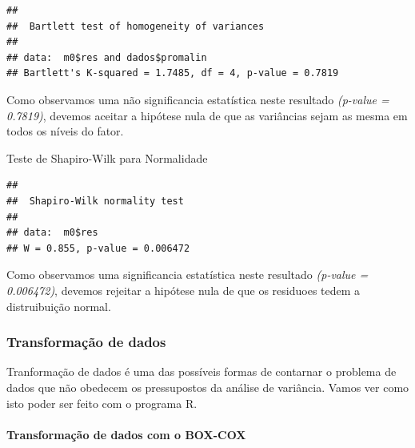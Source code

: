 \documentclass[
]{book}
\newenvironment{Shaded}{\begin{snugshade}}{\end{snugshade}}
\newcommand{\KeywordTok}[1]{\textcolor[rgb]{0.13,0.29,0.53}{\textbf{#1}}}
\newcommand{\NormalTok}[1]{#1}
\newcommand{\OperatorTok}[1]{\textcolor[rgb]{0.81,0.36,0.00}{\textbf{#1}}}
\begin{document}
\begin{Shaded}
\end{Shaded}

\begin{verbatim}
## 
##  Bartlett test of homogeneity of variances
## 
## data:  m0$res and dados$promalin
## Bartlett's K-squared = 1.7485, df = 4, p-value = 0.7819
\end{verbatim}

Como observamos uma não significancia estatística neste resultado \emph{(p-value = 0.7819)}, devemos aceitar a hipótese nula de que as variâncias sejam as mesma em todos os níveis do fator.

Teste de Shapiro-Wilk para Normalidade

\begin{Shaded}
\end{Shaded}

\begin{verbatim}
## 
##  Shapiro-Wilk normality test
## 
## data:  m0$res
## W = 0.855, p-value = 0.006472
\end{verbatim}

Como observamos uma significancia estatística neste resultado \emph{(p-value = 0.006472)}, devemos rejeitar a hipótese nula de que os residuoes tedem a distruibuição normal.

\hypertarget{transformauxe7uxe3o-de-dados-1}{%
\subsubsection{Transformação de dados}\label{transformauxe7uxe3o-de-dados-1}}

Tranformação de dados é uma das possíveis formas de contarnar o problema de dados que não obedecem os pressupostos da análise de variância. Vamos ver como isto poder ser feito com o programa R.

\hypertarget{transformauxe7uxe3o-de-dados-com-o-box-cox}{%
\paragraph{Transformação de dados com o BOX-COX}\label{transformauxe7uxe3o-de-dados-com-o-box-cox}}
\end{document}
